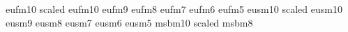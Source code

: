 \usepackage{fancyheadings}
\usepackage{amsmath}
\usepackage{amssymb}
\usepackage{here}
\usepackage{array}
\usepackage{alltt}
\usepackage{graphicx}
\usepackage{eepic,epic}


\newfont{\eufmtwelve}   {eufm10 scaled }
\newfont{\eufmten}      {eufm10 }
\newfont{\eufmnine}     {eufm9 }
\newfont{\eufmeight}    {eufm8 }
\newfont{\eufmseven}    {eufm7 }
\newfont{\eufmsix}      {eufm6 }
\newfont{\eufmfive}     {eufm5 }
\newfont{\eusmtwelve}   {eusm10 scaled }
\newfont{\eusmten}      {eusm10}
\newfont{\eusmnine}     {eusm9 }
\newfont{\eusmeight}    {eusm8 }
\newfont{\eusmseven}    {eusm7 }
\newfont{\eusmsix}      {eusm6 }
\newfont{\eusmfive}     {eusm5 }
\newfont{\msbmtwelve}   {msbm10 scaled }
\newfont{\msbmeight}    {msbm8}

\newcommand{\udl}{\underline}
\newcommand{\udll}[1]{{\udl{\udl{#1}}}}
\newcommand{\udlll}[1]{{\udl{\udl{\udl{#1}}}}}
\newcommand{\mat}[1]{{\mbox{\msbmtwelve {#1}}}}
\newcommand{\Reel}{{\mbox{\msbmtwelve R}}}      %
\newcommand{\reel}{{\mbox{\msbmeight R}}}       %
\newcommand{\Complex}{\mbox{\msbmtwelve C}}     %
\newcommand{\Naturel}{\mbox{\msbmtwelve N}}  %
\newcommand{\naturel}{\mbox{\msbmeight N}}   %

